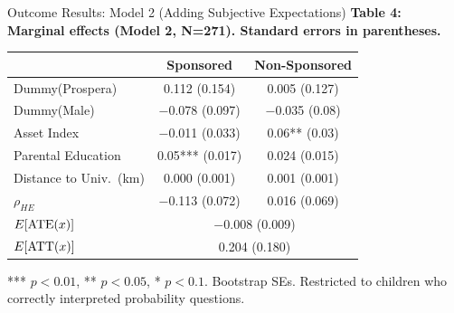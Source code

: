 \documentclass[aspectratio=169, 10pt]{beamer}
\begin{document}
\begin{frame}{Outcome Results: Model 2 (Adding Subjective Expectations)}
  \textbf{Table 4: Marginal effects (Model 2, N=271). Standard errors in parentheses.}
  \begin{center}
  \small
  \begin{tabular}{lcc}
    \toprule
    & \textbf{Sponsored} & \textbf{Non-Sponsored} \\
    \midrule
    Dummy(Prospera)            & 0.112 (0.154)     & 0.005 (0.127)    \\
    Dummy(Male)                & $-$0.078 (0.097)  & $-$0.035 (0.08)  \\
    Asset Index                & $-$0.011 (0.033)  & 0.06** (0.03)    \\
    Parental Education         & 0.05*** (0.017)   & 0.024 (0.015)    \\
    Distance to Univ.\ (km)   & 0.000 (0.001)     & 0.001 (0.001)    \\
    $\rho_{HE}$                & $-$0.113 (0.072)  & 0.016 (0.069)    \\
    \midrule
    $E[\mathrm{ATE}(x)]$               & \multicolumn{2}{c}{$-$0.008 \quad (0.009)} \\
    $E[\mathrm{ATT}(x)]$               & \multicolumn{2}{c}{0.204 \quad (0.180)} \\
    \bottomrule
  \end{tabular}
  \end{center}
  \vspace{0.1em}
  \begin{small}*** $p{<}0.01$, ** $p{<}0.05$, * $p{<}0.1$. Bootstrap SEs. Restricted to children who correctly interpreted probability questions.\end{small}
\end{frame}
\end{document}
